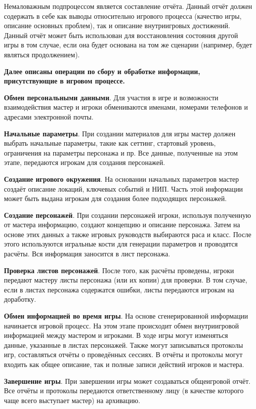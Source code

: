 Немаловажным подпроцессом является составление отчёта. Данный отчёт должен содержать в себе как выводы относительно игрового процесса (качество игры, описание основных проблем), так и описание внутриигровых достижений. Данный отчёт может быть использован для восстановления состояния другой игры в том случае, если она будет основана на том же сценарии (например, будет являться продолжением).




\textbf{Далее описаны операции по сбору и обработке информации, присутствующие в игровом процессе.}

\textbf{Обмен персональными данными}. Для участия в игре и возможности взаимодействия мастер и игроки обмениваются именами, номерами телефонов и адресами электронной почты.

\textbf{Начальные параметры}. При создании материалов для игры мастер должен выбрать начальные параметры, такие как сеттинг, стартовый уровень, ограничения на параметры персонажа и пр. Все данные, полученные на этом этапе, передаются игрокам для создания персонажей.

\textbf{Создание игрового окружения}. На основании начальных параметров мастер создаёт описание локаций, ключевых событий и НИП. Часть этой информации может быть выдана игрокам для создания более подходящих персонажей.

\textbf{Создание персонажей}. При создании персонажей игроки, используя полученную от мастера информацию, создают концепцию и описание персонажа. Затем на основе этих данных а также игровых руководств выбираются раса и класс. После этого используются игральные кости для генерации параметров и проводятся расчёты. Вся информация заносится в лист персонажа.

\textbf{Проверка листов персонажей}. После того, как расчёты проведены, игроки передают мастеру листы персонажа (или их копии) для проверки. В том случае, если в листах персонажа содержатся ошибки, листы передаются игрокам на доработку.

\textbf{Обмен информацией во время игры}. На основе сгенерированной информации начинается игровой процесс. На этом этапе происходит обмен внутриигровой информацией между мастером и игроками. В ходе игры могут изменяться данные, указанные в листах персонажей. Также могут записываться протоколы игр, составляться отчёты о проведённых сессиях. В отчёты и протоколы могут входить как общее описание, так и полные записи действий игроков и мастера.

\textbf{Завершение игры}. При завершении игры может создаваться общеигровой отчёт. Все отчёты и протоколы передаются ответственному лицу (в качестве которого чаще всего выступает мастер) на архивацию.
